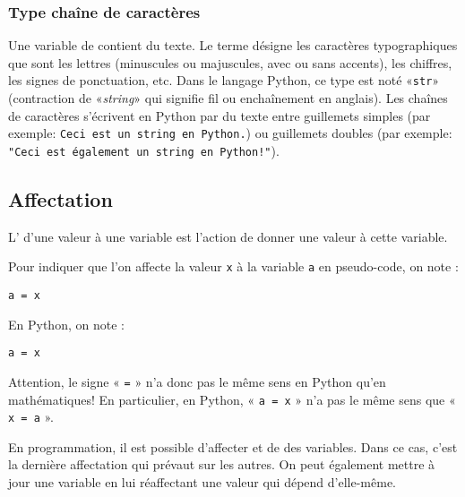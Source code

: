 \subsubsection{Type chaîne de caractères}

Une variable de  contient du texte. Le terme  désigne les caractères typographiques que sont les lettres (minuscules ou majuscules, avec ou sans accents), les chiffres, les signes de ponctuation, etc. Dans le langage Python, ce type est noté «\texttt{str}» (contraction de «\textit{string}» qui signifie fil ou enchaînement en anglais). Les chaînes de caractères s'écrivent en Python par du texte entre guillemets simples (par exemple: \texttt{\textquotesingle Ceci est un string en Python.\textquotesingle}) ou guillemets doubles (par exemple: \texttt{"Ceci est également un string en Python!"}).

\subsection{Affectation}

\begin{definition}
	L' d'une valeur à une variable est l'action de donner une valeur à cette variable.
\end{definition}
Pour indiquer que l'on affecte la valeur \texttt{x} à la variable \texttt{a} en pseudo-code, on note : 
\begin{center}
	\begin{varwidth}[t]{.5\textwidth}
		\begin{lstlisting}[language=Pseudo,linewidth = 3cm]
a = x
\end{lstlisting}\end{varwidth}\end{center}
En Python, on note :
\begin{center}
	\begin{varwidth}[t]{.5\textwidth}
\begin{lstlisting}[language=iPython,linewidth = 3cm]
a = x\end{lstlisting}\end{varwidth}\end{center}
Attention, le signe « \texttt{=} » n'a donc pas le même sens en Python qu'en mathématiques! En particulier, en Python, « \texttt{a = x} » n'a pas le même sens que « \texttt{x = a} ».

En programmation, il est possible d'affecter et de  des variables. Dans ce cas, c'est la dernière affectation qui prévaut sur les autres. On peut également mettre à jour une variable en lui réaffectant une valeur qui dépend d'elle-même.

